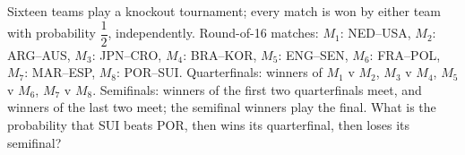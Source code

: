 Sixteen teams play a knockout tournament; every match is won by either team with probability $\dfrac12$, independently. Round-of-16 matches: $M_1$: NED--USA, $M_2$: ARG--AUS, $M_3$: JPN--CRO, $M_4$: BRA--KOR, $M_5$: ENG--SEN, $M_6$: FRA--POL, $M_7$: MAR--ESP, $M_8$: POR--SUI. Quarterfinals: winners of $M_1$ v $M_2$, $M_3$ v $M_4$, $M_5$ v $M_6$, $M_7$ v $M_8$. Semifinals: winners of the first two quarterfinals meet, and winners of the last two meet; the semifinal winners play the final. What is the probability that SUI beats POR, then wins its quarterfinal, then loses its semifinal?
